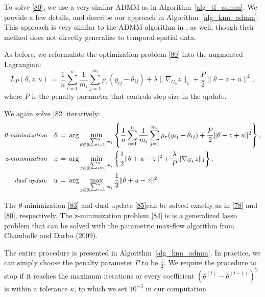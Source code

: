 \documentclass[twoside,11pt]{article}
\begin{document}
To solve \eqref{80}, we use a very similar ADMM as in Algorithm~\ref{alg_tf_admm}. We provide a few details, and describe our approach in Algorithm~\ref{alg_knn_admm}. This approach is very similar to the ADMM algorithm in \cite{ye2021non}, as well, though their method does not directly generalize to temporal-spatial data. 

As before, we  reformulate the optimization problem \eqref{80} into the augmented Lagrangian:
\begin{equation}
\label{82}
L_P(\theta, z, u) \,=\, \frac{1}{n} \sum_{i=1}^{n} \frac{1}{m_i} \sum_{j=1}^{m_i} \rho_\tau (y_{ij} - \theta_{ij}) + \lambda \|\nabla_{G_k} z\|_1 + \frac{P}{2} \| \theta - z + u \|^2,
\end{equation}
where \( P \) is the penalty parameter that controls step size in the update. 

We again solve \eqref{82} iteratively:
\begin{align}
\label{83}
\text{\small \textit{$\theta$-minimization}} \quad \theta &\,=\, \arg\min_{\theta \in \mathbb{R}^{\sum_{i=1}^n m_i}} \left\{ \frac{1}{n} \sum_{i=1}^{n} \frac{1}{m_i} \sum_{j=1}^{m_i} \rho_\tau (y_{ij} - \theta_{ij}) + \frac{P}{2} \| \theta - z + u \|^2 \right\}, \\
\label{84}
\text{\small \textit{z-minimization}} \quad z &\,=\, \arg\min_{z \in \mathbb{R}^{\sum_{i=1}^n m_i}} \left\{ \frac{1}{2} \| \theta + u - z \|^2 + \frac{\lambda}{P} \|\nabla_{G_k} z\|_1 \right\}, \\ 
\label{85}
\text{\small \textit{dual update}} \quad u &\,=\, \arg\max_{z \in \mathbb{R}^{\sum_{i=1}^n m_i}} \frac{1}{2} \| \theta + u - z \|^2.
\end{align}

The $\theta$-minimization \eqref{83} and dual update \eqref{85}can be solved exactly as in \eqref{78} and \eqref{80}, respectively. The z-minimization problem \eqref{84} is is a generalized lasso problem that can be solved with the parametric max-flow algorithm from Chambolle and Darbo (2009).

The entire procedure is presented in Algorithm~\ref{alg_knn_admm}. In practice, we can simply choose the penalty parameter \( P \) to be \( \frac{1}{2} \). We require the procedure to stop if it reaches the maximum iterations or every coefficient \( (\theta^{(t)} - \theta^{(t-1)})^{2} \) is within a tolerance \( \kappa \), to which we set \( 10^{-3} \) in our computation. 
\end{document}
